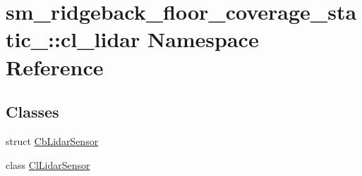 \hypertarget{namespacesm__ridgeback__floor__coverage__static__1_1_1cl__lidar}{}\section{sm\+\_\+ridgeback\+\_\+floor\+\_\+coverage\+\_\+static\+\_\+:\+:cl\+\_\+lidar Namespace Reference}
\label{namespacesm__ridgeback__floor__coverage__static__1_1_1cl__lidar}
\subsection*{Classes}
\begin{DoxyCompactItemize}
\item 
struct \hyperlink{structsm__ridgeback__floor__coverage__static__1_1_1cl__lidar_1_1CbLidarSensor}{Cb\+Lidar\+Sensor}
\item 
class \hyperlink{classsm__ridgeback__floor__coverage__static__1_1_1cl__lidar_1_1ClLidarSensor}{Cl\+Lidar\+Sensor}
\end{DoxyCompactItemize}
